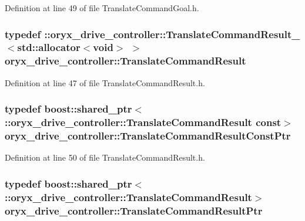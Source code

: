\-Definition at line 49 of file \-Translate\-Command\-Goal.\-h.

\subsubsection[{\-Translate\-Command\-Result}]{\setlength{\rightskip}{0pt plus 5cm}typedef \-::{\bf oryx\-\_\-drive\-\_\-controller\-::\-Translate\-Command\-Result\-\_\-}$<$std\-::allocator$<$void$>$ $>$ {\bf oryx\-\_\-drive\-\_\-controller\-::\-Translate\-Command\-Result}}\label{namespaceoryx__drive__controller_a462e7faed5e47b9cf03730ab81c43789}


\-Definition at line 47 of file \-Translate\-Command\-Result.\-h.

\subsubsection[{\-Translate\-Command\-Result\-Const\-Ptr}]{\setlength{\rightskip}{0pt plus 5cm}typedef boost\-::shared\-\_\-ptr$<$ \-::{\bf oryx\-\_\-drive\-\_\-controller\-::\-Translate\-Command\-Result} const$>$ {\bf oryx\-\_\-drive\-\_\-controller\-::\-Translate\-Command\-Result\-Const\-Ptr}}\label{namespaceoryx__drive__controller_a78664b04993913961baed471a6c04592}


\-Definition at line 50 of file \-Translate\-Command\-Result.\-h.

\subsubsection[{\-Translate\-Command\-Result\-Ptr}]{\setlength{\rightskip}{0pt plus 5cm}typedef boost\-::shared\-\_\-ptr$<$ \-::{\bf oryx\-\_\-drive\-\_\-controller\-::\-Translate\-Command\-Result}$>$ {\bf oryx\-\_\-drive\-\_\-controller\-::\-Translate\-Command\-Result\-Ptr}}\label{namespaceoryx__drive__controller_a85421e091381f5207ab0541a69bad45b}


